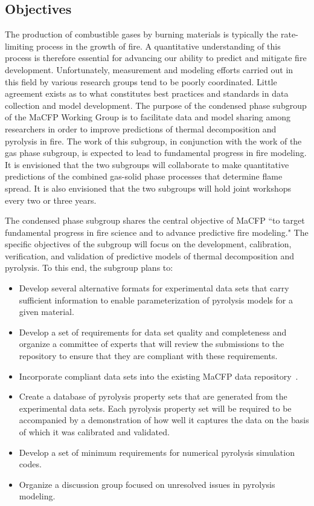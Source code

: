 
\subsection{Objectives} \label{sec:CPS_session_1}

The production of combustible gases by burning materials is typically the rate-limiting process in the growth of fire.  A quantitative understanding of this process is therefore essential for advancing our ability to predict and mitigate fire development.  Unfortunately, measurement and modeling efforts carried out in this field by various research groups tend to be poorly coordinated.  Little agreement exists as to what constitutes best practices and standards in data collection and model development.  The purpose of the condensed phase subgroup of the MaCFP Working Group is to facilitate data and model sharing among researchers in order to improve predictions of thermal decomposition and pyrolysis in fire.  The work of this subgroup, in conjunction with the work of the gas phase subgroup, is expected to lead to fundamental progress in fire modeling.  It is envisioned that the two subgroups will collaborate to make quantitative predictions of the combined gas-solid phase processes that determine flame spread.  It is also envisioned that the two subgroups will hold joint workshops every two or three years.

The condensed phase subgroup shares the central objective of MaCFP ``to target fundamental progress in fire science and to advance predictive fire modeling."  The specific objectives of the subgroup will focus on the development, calibration, verification, and validation of predictive models of thermal decomposition and pyrolysis.  To this end, the subgroup plans to:

\begin{itemize}
\item Develop several alternative formats for experimental data sets that carry sufficient information to enable parameterization of pyrolysis models for a given material.
\item Develop a set of requirements for data set quality and completeness and organize a committee of experts that will review the submissions to the repository to ensure that they are compliant with these requirements.
\item Incorporate compliant data sets into the existing MaCFP data repository~\cite{MaCFP_repository}.
\item Create a database of pyrolysis property sets that are generated from the experimental data sets.  Each pyrolysis property set will be required to be accompanied by a demonstration of how well it captures the data on the basis of which it was calibrated and validated.
\item Develop a set of minimum requirements for numerical pyrolysis simulation codes.
\item Organize a discussion group focused on unresolved issues in pyrolysis modeling.
\end{itemize}

